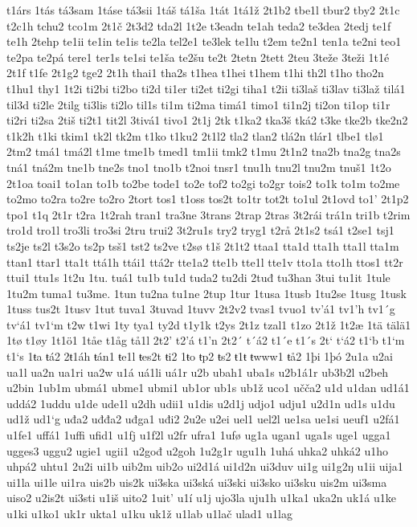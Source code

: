 t1árs
1tás
tá3sam
1táse
tá3sii
1táš
tá1ša
1tát
1tá1ž
2t1b2
tbe1l
tbur2
tby2
2t1c
t2c1h
tchu2
tco1m
2t1č
2t3d2
tda2l
1t2e
t3eadn
te1ah
teda2
te3dea
2tedj
te1f
te1h
2tehp
te1ii
te1in
te1is
te2la
tel2e1
te3lek
te1lu
t2em
te2n1
ten1a
te2ni
teo1
te2pa
te2pá
tere1
ter1s
te1si
te1ša
te2šu
te2t
2tetn
2tett
2teu
3teže
3teži
1t1é
2t1f
t1fe
2t1g2
tge2
2t1h
thai1
tha2s
t1hea
t1hei
t1hem
t1hi
th2l
t1ho
tho2n
t1hu1
thy1
1t2i
ti2bi
ti2bo
ti2d
ti1er
ti2et
ti2gi
tiha1
t2ii
ti3laš
ti3lav
ti3laž
tilá1
til3d
ti2le
2tilg
ti3lis
ti2lo
til1s
ti1m
ti2ma
timá1
timo1
ti1n2j
ti2on
ti1op
ti1r
ti2ri
ti2sa
2tiš
ti2t1
tit2l
3tivá1
tivo1
2t1j
2tk
t1ka2
tka3š
tká2
t3ke
tke2b
tke2n2
t1k2h
t1ki
tkim1
tk2l
tk2m
t1ko
t1ku2
2t1l2
tla2
tlan2
tlá2n
tlár1
tlbe1
tlø1
2tm2
tmá1
tmá2l
t1me
tme1b
tmed1
tm1ii
tmk2
t1mu
2t1n2
tna2b
tna2g
tna2s
tná1
tná2m
tne1b
tne2s
tno1
tno1b
t2noi
tnsr1
tnu1h
tnu2l
tnu2m
tnuš1
1t2o
2t1oa
toai1
to1an
to1b
to2be
tode1
to2e
tof2
to2gi
to2gr
tois2
to1k
to1m
to2me
to2mo
to2ra
to2re
to2ro
2tort
tos1
t1oss
tos2t
to1tr
tot2t
to1ul
2t1ovd
to1'
2t1p2
tpo1
t1q
2t1r
t2ra
1t2rah
tran1
tra3ne
3trans
2trap
2tras
3t2rái
trá1n
tri1b
t2rim
tro1d
tro1l
tro3li
tro3si
2tru
trui2
3t2ru1s
try2
tryg1
t2rå
2t1s2
tsá1
t2se1
tsj1
ts2je
ts2l
t3s2o
ts2p
tsš1
tst2
ts2ve
t2sø
t1š
2t1t2
ttaa1
tta1d
tta1h
tta1l
tta1m
ttan1
ttar1
tta1t
ttá1h
ttái1
ttá2r
tte1a2
tte1b
tte1l
tte1v
tto1a
tto1h
ttos1
tt2r
ttui1
ttu1s
1t2u
1tu.
tuá1
tu1b
tu1d
tuda2
tu2di
2tuđ
tu3han
3tui
tu1it
1tule
1tu2m
tuma1
tu3me.
1tun
tu2na
tu1ne
2tup
1tur
1tusa
1tusb
1tu2se
1tusg
1tusk
1tuss
tus2t
1tusv
1tut
tuva1
3tuvad
1tuvv
2t2v2
tvas1
tvuo1
tv'á1
tv1'h
tv1´g
tv`á1
tv1`m
t2w
t1wi
1ty
tya1
ty2d
t1y1k
t2ys
2t1z
tzal1
t1zo
2t1ž
1t2æ
1tä
tälä1
1tø
t1øy
1t1ö1
1tåe
t1åg
tå1l
2t2'
t2'á
t1'n
2t2´
t´á2
t1´e
t1´s
2t`
t`á2
t1`b
t1`m
t1`s
1ŧa
ŧá2
2ŧ1áh
ŧán1
ŧe1l
ŧes2t
ŧi2
1ŧo
ŧp2
ŧs2
ŧ1ŧ
ŧwww1
ŧå2
1þi
1þó
2u1a
u2ai
ua1l
ua2n
ua1ri
ua2w
u1á
uá1li
uá1r
u2b
ubah1
uba1s
u2b1á1r
ub3b2l
u2beh
u2bin
1ub1m
ubmá1
ubme1
ubmi1
ub1or
ub1s
ub1ž
uco1
učča2
u1d
u1dan
ud1á1
uddá2
1uddu
u1de
ude1l
u2dh
udii1
u1dis
u2d1j
udjo1
udju1
u2d1n
ud1s
u1du
ud1ž
ud1`g
uđa2
uđđa2
uđga1
uđi2
2u2e
u2ei
uel1
uel2l
ue1sa
ue1si
ueuf1
u2fá1
u1fe1
uffá1
1uffi
ufid1
u1fj
u1f2l
u2fr
ufra1
1ufø
ug1a
ugan1
uga1s
uge1
ugga1
ugges3
uggu2
ugie1
ugii1
u2gođ
u2goh
1u2g1r
ugu1h
1uhá
uhka2
uhká2
u1ho
uhpá2
uhtu1
2u2i
ui1b
uib2m
uib2o
ui2d1á
ui1d2n
ui3duv
ui1g
ui1g2ŋ
u1ii
uija1
ui1la
ui1le
ui1ra
uis2b
uis2k
ui3ska
ui3ská
ui3ski
ui3sko
ui3sku
uis2m
ui3sma
uiso2
u2is2t
ui3sti
u1iš
uito2
1uit'
u1í
u1j
ujo3la
uju1h
u1ka1
uka2n
uk1á
u1ke
u1ki
u1ko1
uk1r
ukta1
u1ku
uk1ž
u1lab
u1lač
ulad1
u1lag
